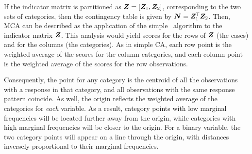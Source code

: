 If the indicator matrix is partitioned as
$\bm{Z} = [ \bm{Z}_1 , \bm{Z}_2 ]$, corresponding to the two sets of
categories, then the contingency table is given by
$\bm{N} = \bm{Z}_1 ^\mathsf{T} \bm{Z}_2$.
Then, MCA can be described as the application of the simple \CA\
algorithm to the indicator matrix $\bm{Z}$.
This analysis would yield scores for the rows of $\bm{Z}$ (the cases)
and for the columns (the categories).
As in simple CA, each row point is the weighted average of the scores
for the column categories, and each column point is the weighted average
of the scores for the row observations.

Consequently, the point for any category is the centroid of all the
observations with a response in that category, and
all observations with the same response pattern coincide.
As well, the origin reflects the weighted average of the categories for
\emph{each} variable.  As a result, category points with low marginal
frequencies will be located further away from the origin,
while categories with high marginal frequencies will be closer to the
origin.
For a binary variable, the two category points will appear on a line
through the origin, with distances inversely proportional to their
marginal frequencies.

